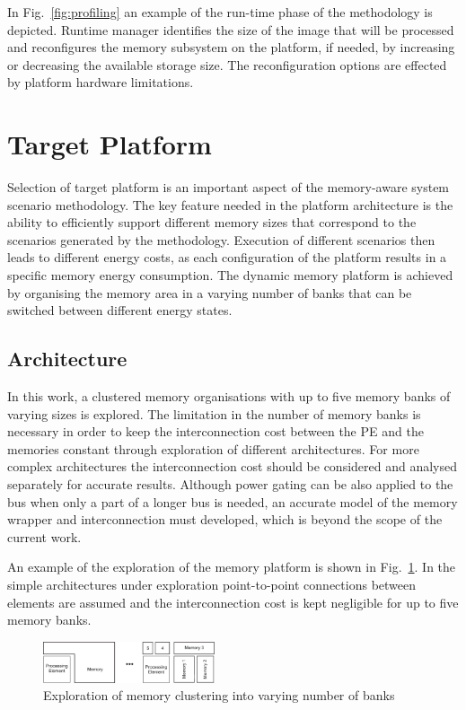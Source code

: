 \documentclass[a4paper,conference]{IEEEtran}
\begin{document}
In Fig.~\ref{fig:profiling} an example of the run-time phase of the methodology is depicted. Runtime manager identifies the size of the image that will be processed and reconfigures the memory subsystem on the platform, if needed, by increasing or decreasing the available storage size. The reconfiguration options are effected by platform hardware limitations.

\section{Target Platform}
\label{sec:platform}

Selection of target platform is an important aspect of the memory-aware system scenario methodology. The key feature needed in the platform architecture is the ability to efficiently support different memory sizes that correspond to the scenarios generated by the methodology. Execution of different scenarios then leads to different energy costs, as each configuration of the platform results in a specific memory energy consumption. The dynamic memory platform is achieved by organising the memory area in a varying number of banks that can be switched between different energy states. 

\subsection{Architecture}

In this work, a clustered memory organisations with up to five memory banks of varying sizes is explored. The limitation in the number of memory banks is necessary in order to keep the interconnection cost between the PE and the memories constant through exploration of different architectures. For more complex architectures the interconnection cost should be considered and analysed separately for accurate results. Although power gating can be also applied to the bus when only a part of a longer bus is needed, an accurate model of the memory wrapper and interconnection must developed, which is beyond the scope of the current work. 

An example of the exploration of the memory platform is shown in Fig.~\ref{fig:platform}. In the simple architectures under exploration point-to-point connections between elements are assumed and the interconnection cost is kept negligible for up to five memory banks.

\begin{figure}[!t]
\centering
\includegraphics[width=0.45\textwidth]{Images/platform.eps}
\caption{Exploration of memory clustering into varying number of banks}
\label{fig:platform}
\end{figure}
\end{document}
